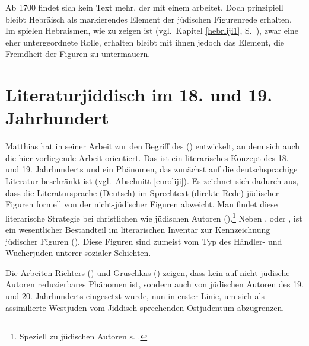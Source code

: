 Ab 1700 findet sich kein Text mehr, der mit einem  \hai{{\LiHe}} arbeitet. Doch prinzipiell bleibt Hebräisch als markierendes Element der jüdischen Figurenrede erhalten. Im \hai{{\LiJi}} spielen Hebraismen, wie zu zeigen ist (vgl.\, Kapitel \ref{hebrliji1}, S.\, \pageref{hebrliji1}), zwar eine eher untergeordnete Rolle, erhalten bleibt mit ihnen jedoch das Element, die Fremdheit der Figuren zu untermauern.


\section{Literaturjiddisch im 18. und 19. Jahrhundert}\label{literaturwissenschaft}
 
Matthias \cite{Richter1995} hat in seiner Arbeit zur  den Begriff des  (\hai{{\LiJi}}) entwickelt, an dem sich auch die hier vorliegende Arbeit orientiert. Das \hai{{\LiJi}} ist ein literarisches Konzept des 18. und 19. Jahrhunderts und ein Phänomen, das zunächst auf die deutschsprachige Literatur beschränkt ist (vgl.\, Abschnitt \ref{euroliji}). Es zeichnet sich dadurch aus, dass die Literatursprache (Deutsch) im Sprechtext (direkte Rede) jüdischer Figuren formell von der nicht-jüdischer Figuren abweicht. Man findet diese literarische Strategie bei christlichen wie jüdischen Autoren (\citealt{Richter1995}).\footnote{Speziell zu jüdischen Autoren s. \cite{Gruschka2003}.} Neben ,  oder , ist \hai{{\LiJi}} ein wesentlicher Bestandteil im literarischen Inventar zur Kennzeichnung jüdischer Figuren (\citealt[98f]{Gruschka2003}). Diese Figuren sind zumeist vom Typ des Händler- und Wucherjuden unterer sozialer Schichten.

Die Arbeiten Richters (\citeyear{Richter1995}) und Gruschkas (\citeyear{Gruschka2003}) zeigen, dass \hai{{\LiJi}} kein auf nicht-jüdische Autoren reduzierbares Phänomen ist, sondern auch von jüdischen Autoren des 19. und 20. Jahrhunderts eingesetzt wurde, nun in erster Linie, um sich als assimilierte Westjuden vom Jiddisch sprechenden Ostjudentum abzugrenzen. 

